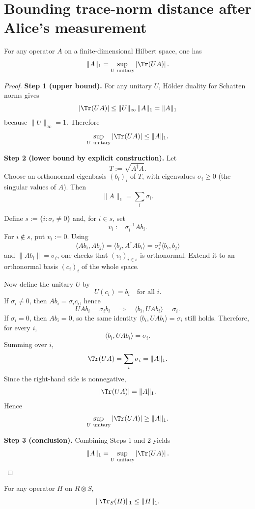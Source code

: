 \section{Bounding trace-norm distance after Alice's measurement}

\begin{lemma}
\label{lem:trace-variational}
\leanok
For any operator $A$ on a finite-dimensional Hilbert space,
one has
\[
\|A\|_1 = \sup_{U\ \mathrm{unitary}} \left|\Tr(UA)\right|.
\]
\end{lemma}

\begin{proof}
\textbf{Step 1 (upper bound).}
For any unitary $U$, Hölder duality for Schatten norms gives
\[
\left|\Tr(UA)\right|
\le \|U\|_\infty\,\|A\|_1
= \|A\|_1
\]
because $\|U\|_\infty=1$. Therefore
\[
\sup_{U\ \mathrm{unitary}} \left|\Tr(UA)\right| \le \|A\|_1.
\]

\textbf{Step 2 (lower bound by explicit construction).}
Let
\[
T:=\sqrt{A^\dagger A}.
\]
Choose an orthonormal eigenbasis $(b_i)_i$ of $T$, with eigenvalues
$\sigma_i\ge 0$ (the singular values of $A$). Then
\[
\|A\|_1=\sum_i \sigma_i.
\]

Define $s:=\{i:\sigma_i\neq 0\}$ and, for $i\in s$, set
\[
v_i:=\sigma_i^{-1}A b_i.
\]
For $i\notin s$, put $v_i:=0$.
Using
\[
\langle A b_i, A b_j\rangle
=\langle b_j,A^\dagger A b_i\rangle
=\sigma_i^2\langle b_i,b_j\rangle
\]
and $\|A b_i\|=\sigma_i$, one checks that $(v_i)_{i\in s}$ is orthonormal.
Extend it to an orthonormal basis $(c_i)_i$ of the whole space.

Now define the unitary $U$ by
\[
U(c_i)=b_i\quad\text{for all }i.
\]
If $\sigma_i\neq 0$, then $A b_i=\sigma_i c_i$, hence
\[
U A b_i=\sigma_i b_i
\quad\Rightarrow\quad
\langle b_i,U A b_i\rangle=\sigma_i.
\]
If $\sigma_i=0$, then $A b_i=0$, so the same identity
$\langle b_i,U A b_i\rangle=\sigma_i$ still holds.
Therefore, for every $i$,
\[
\langle b_i,U A b_i\rangle=\sigma_i.
\]
Summing over $i$,
\[
\Tr(UA)=\sum_i \sigma_i=\|A\|_1.
\]
Since the right-hand side is nonnegative,
\[
\left|\Tr(UA)\right|=\|A\|_1.
\]
Hence
\[
\sup_{U\ \mathrm{unitary}} \left|\Tr(UA)\right|\ge \|A\|_1.
\]

\textbf{Step 3 (conclusion).}
Combining Steps 1 and 2 yields
\[
\|A\|_1=\sup_{U\ \mathrm{unitary}} \left|\Tr(UA)\right|.
\]
\end{proof}

\begin{lemma}
\label{lem:partial-trace-contractive}
\leanok
For any operator $H$ on $R\otimes S$,
\[
\|\Tr_S(H)\|_1 \le \|H\|_1.
\]
\end{lemma}

